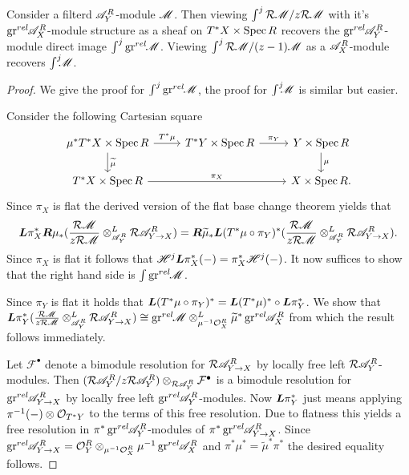 \begin{lemma}\label{lem: ReesAndOtherDirectImagesAgree}
  Consider a filterd $\mathscr{A}_Y^R$-module $\mathscr{M}$. Then viewing $\int^j \mathcal{R}\mathscr{M} / z\mathcal{R}\mathscr{M}$ with it's $\operatorname{gr}^{rel}\mkern-5mu\mathscr{A}_X^R$-module structure as a sheaf on $T^*X\times \operatorname{Spec} R$ recovers the $\operatorname{gr}^{rel}\mkern-5mu\mathscr{A}_Y^R$-module direct image $\int^j \operatorname{gr}^{rel}\mkern-5mu\mathscr{M}$. Viewing  $\int^j \mathcal{R}\mathscr{M} / (z-1)\mathscr{M}$ as a $\mathscr{A}_X^R$-module recovers $\int^j \mkern -8mu \mathscr{M}$.
\end{lemma}
\begin{proof}
  We give the proof for $\int^j \operatorname{gr}^{rel}\mkern-5mu \mathscr{M}$, the proof for $\int^j \mkern -8mu \mathscr{M}$ is similar but easier.


  Consider the following Cartesian square
  $$
      \begin{tikzcd}
        \mu^*T^* X \times \Spec R \arrow{r}{T^*\mu} \arrow{d}{{\widetilde{\mu}}} &T^*Y\times \Spec R \arrow{r}{\pi_Y} & Y\times \Spec R\arrow{d}{\mu} \\
        T^*X\arrow{rr}{\pi_X}  \times \Spec R && X\times \Spec R.
      \end{tikzcd}
  $$
  Since $\pi_X$ is flat the derived version of the flat base change theorem yields that 
  $$\boldsymbol{L}\pi_X^*\boldsymbol{R}\mu_*(\frac{\mathcal{R}\mathscr{M}}{z\mathcal{R} \mathscr{M}}\otimes^L_{\mathscr{A}_Y^R}\mathcal{R} \mathscr{A}_{Y\to X}^R) = \boldsymbol{R}\widetilde{\mu}_*\boldsymbol{L}(T^*\mu\circ\pi_Y)^*(\frac{\mathcal{R}\mathscr{M}}{z\mathcal{R} \mathscr{M}}\otimes^L_{\mathscr{A}_Y^R}\mathcal{R} \mathscr{A}_{Y\to X}^R).$$
  Since $\pi_X$ is flat it follows that $\mathscr{H}^j \boldsymbol{L}\pi_X^*({-}) = \pi_X^*\mathscr{H}^j({-})$. It now suffices to show that the right hand side is $\int \operatorname{gr}^{rel}\mkern-5mu\mathscr{M}$.

  Since $\pi_Y$ is flat it holds that $\boldsymbol{L}(T^*\mu \circ \pi_Y)^* = \boldsymbol{L} (T^*\mu)^* \circ \boldsymbol{L} \pi_Y^*$.
  We show that $\boldsymbol{L}\pi_Y^*(\frac{\mathcal{R}\mathscr{M}}{z\mathcal{R} \mathscr{M}}\otimes^L_{\mathscr{A}_Y^R}\mathcal{R} \mathscr{A}_{Y\to X}^R)\cong \operatorname{gr}^{rel}\mkern-5mu\mathscr{M} \otimes^L_{\mu^{-1}\mathcal{O}_X^R}\widetilde{\mu}^*\operatorname{gr}^{rel}\mkern-5mu\mathscr{A}_{X}^R$ from which the result follows immediately.

  Let $\mathcal{F}^\bullet$ denote a bimodule resolution for $\mathcal{R} \mathscr{A}_{Y\to X}^R$ by locally free left $\mathcal{R}\mathscr{A}_Y^R$-modules.
  Then $(\mathcal{R} \mathscr{A}_Y^R / z\mathcal{R} \mathscr{A}_Y^R)\otimes_{\mathcal{R} \mathscr{A}_Y^R}\mathcal{F}^\bullet$ is a bimodule resolution for $\operatorname{gr}^{rel}\mkern-5mu \mathscr{A}_{Y\to X}^R$ by locally free left $\operatorname{gr}^{rel}\mkern-5mu\mathscr{A}_Y^R$-modules.
  Now $\boldsymbol{L}\pi_Y^*$ just means applying $\pi^{-1}({-})\otimes \mathcal{O}_{T^*Y}$ to the terms of this free resolution.
  Due to flatness this yields a free resolution in $\pi^{*}\operatorname{gr}^{rel}\mkern-5mu\mathscr{A}_Y^R$-modules of $\pi^* \operatorname{gr}^{rel}\mkern-5mu\mathscr{A}_{Y\to X}^R$.
  Since $\operatorname{gr}^{rel}\mkern-5mu \mathscr{A}_{Y\to X}^R = \mathcal{O}_Y^R \otimes_{\mu^{-1}\mathcal{O}_X^R} \mu^{-1}\operatorname{gr}^{rel}\mkern-5mu\mathscr{A}_X^R$ and $\pi^*\mu^* = \widetilde{\mu}^*\pi^*$ the desired equality follows. 
\end{proof}
